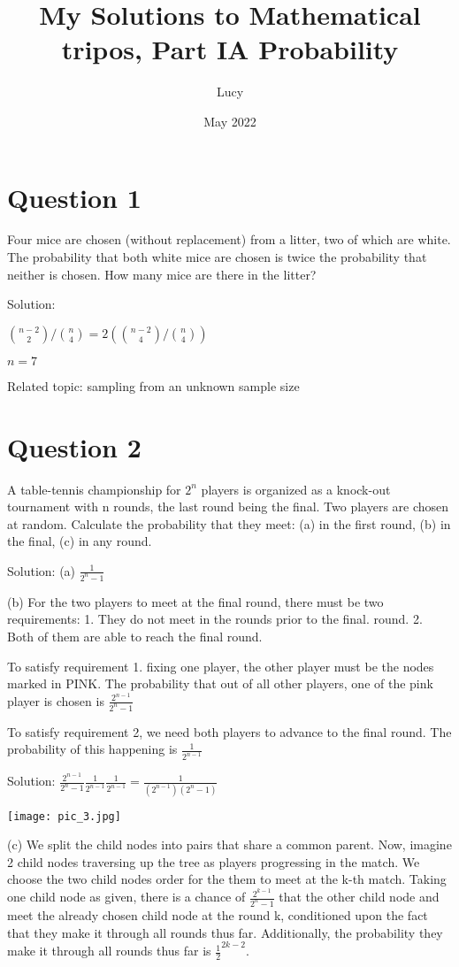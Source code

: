 \documentclass{article}
\title{My Solutions to Mathematical tripos, Part IA Probability}
\author{Lucy}
\date{May 2022}
\begin{document}
\maketitle

\section{Question 1}

Four mice are chosen (without replacement) from a litter, two of which are white. The probability that both white mice are chosen is twice the probability that neither is chosen. How many mice are there in the litter?

Solution: 

$ { n - 2 \choose 2} / {n \choose 4} = 2 ( {n - 2 \choose 4 }/ {n \choose 4}) $

$n = 7$

Related topic: sampling from an unknown sample size

\section{Question 2}

A table-tennis championship for $2^n$ players is organized as a knock-out tournament with n rounds,
the last round being the final. Two players are chosen at random. Calculate the probability that they
meet: (a) in the first round, (b) in the final, (c) in any round.

Solution: 
(a) $ \frac{1}{2^n - 1} $

(b) For the two players to meet at the final round, there must be two requirements: 1. They do not meet in the rounds prior to the final. round. 2. Both of them are able to reach the final round.

To satisfy requirement 1. fixing one player, the other player must  be the nodes marked in PINK. The probability that out of all other players, one of the pink player is chosen is $ \frac{2^{n-1}}{2^n - 1} $

To satisfy requirement 2, we need both players to advance to the final round. The probability of this happening is $ \frac{1}{2^{n-1}} $

Solution: $ \frac{2^{n-1}}{2^n - 1} \frac{1}{2^{n-1}}\frac{1}{2^{n-1}} = \frac{1}{(2^{n-1})(2^n - 1)} $

\texttt{[image: pic\_3.jpg]}

(c) We split the child nodes into pairs that share a common parent. Now, imagine 2 child nodes traversing up the tree as players progressing in the match. We choose the two child nodes order for the them to meet at the k-th match. Taking one child node as given, there is a chance of $\frac{2^{k-1}}{2^n - 1}$ that the other child node and meet the already chosen child node at the round k, conditioned upon the fact that they make it through all rounds thus far. Additionally, the probability they make it through all rounds thus far is $\frac{1}{2}^{2k-2}$. 
\end{document}
